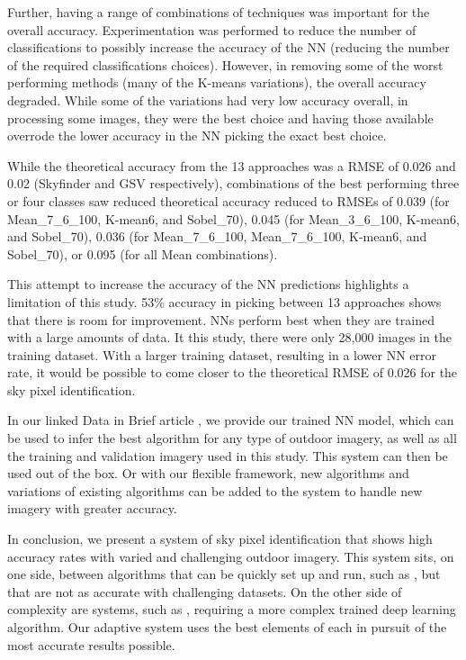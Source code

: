 \documentclass[final,3p,times,authoryear]{elsarticle}
\begin{document}
Further, having a range of combinations of techniques was important for the overall accuracy. Experimentation was performed to reduce the number of classifications to possibly increase the accuracy of the NN (reducing the number of the required classifications choices). However, in removing some of the worst performing methods (many of the K-means variations), the overall accuracy degraded. While some of the variations had very low accuracy overall, in processing some images, they were the best choice and having those available overrode the lower accuracy in the NN picking the exact best choice.

While the theoretical accuracy from the 13 approaches was a RMSE of 0.026 and 0.02 (Skyfinder and GSV respectively), combinations of the best performing three or four classes saw reduced theoretical accuracy reduced to RMSEs of 0.039 (for Mean\_7\_6\_100, K-mean6, and Sobel\_70), 0.045 (for Mean\_3\_6\_100, K-mean6, and Sobel\_70), 0.036 (for Mean\_7\_6\_100, Mean\_7\_6\_100, K-mean6, and Sobel\_70), or 0.095 (for all Mean combinations). 

This attempt to increase the accuracy of the NN predictions highlights a limitation of this study. 53\% accuracy in picking between 13 approaches shows that there is room for improvement. NNs perform best when they are trained with a large amounts of data. It this study, there were only 28,000 images in the training dataset. With a larger training dataset, resulting in a lower NN error rate, it would be possible to come closer to the theoretical RMSE of 0.026 for the sky pixel identification.

In our linked Data in Brief article \citep{Nice2019Data}, we provide our trained NN model, which can be used to infer the best algorithm for any type of outdoor imagery, as well as all the training and validation imagery used in this study. This system can then be used out of the box. Or with our flexible framework, new algorithms and variations of existing algorithms can be added to the system to handle new imagery with greater accuracy. 

In conclusion, we present a system of sky pixel identification that shows high accuracy rates with varied and challenging outdoor imagery. This system sits, on one side, between algorithms that can be quickly set up and run, such as \cite{Middel2018}, but that are not as accurate with challenging datasets. On the other side of complexity are systems, such as \cite{Gong2018}, requiring a more complex trained deep learning algorithm. Our adaptive system uses the best elements of each in pursuit of the most accurate results possible.
\end{document}
